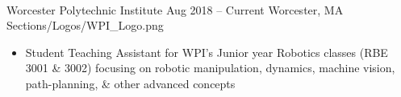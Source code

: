 \divider \\
    {Worcester Polytechnic Institute}
    {Aug 2018 -- Current}
    {Worcester, MA}
    {Sections/Logos/WPI_Logo.png}
    \begin{itemize}
        \item Student Teaching Assistant for WPI’s Junior year Robotics classes (RBE 3001 \& 3002) focusing on robotic manipulation, dynamics, machine vision, path-planning, \& other advanced concepts
    \end{itemize}

